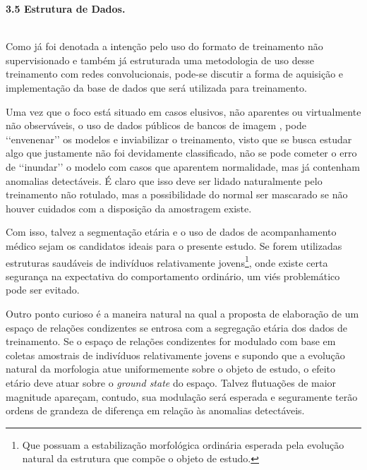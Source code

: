 \documentclass[a4paper, 12pt]{report}
\begin{document}
$\frac{}{}$\\
\begin{Large}
	\textbf{3.5 Estrutura de Dados.}
\end{Large}
$\frac{}{}$\\

Como já foi denotada a intenção pelo uso do formato de treinamento não supervisionado\cite{Garg2016,Zhang2022,Nakao2021,Cao2022} e também já estruturada uma metodologia de uso desse treinamento com redes convolucionais, pode-se discutir a forma de aquisição e implementação da base de dados que será utilizada para treinamento. 

Uma vez que o foco está situado em casos elusivos, não aparentes ou virtualmente não observáveis, o uso de dados públicos de bancos de imagem \cite{LaMontagne2019,Marcus2010,Marcus2007,2020, 2025}, pode {\lq\lq}envenenar{\rq\rq} os modelos e inviabilizar o treinamento, visto que se busca estudar algo que justamente não foi devidamente classificado, não se pode cometer o erro de {\lq\lq}inundar{\rq\rq} o modelo com casos que aparentem normalidade, mas já contenham anomalias detectáveis. É claro que isso deve ser lidado naturalmente pelo treinamento não rotulado, mas a possibilidade do normal ser mascarado se não houver cuidados com a disposição da amostragem existe.

Com isso, talvez a segmentação etária e o uso de dados de acompanhamento médico
sejam os candidatos ideais para o presente estudo. Se forem utilizadas estruturas saudáveis de indivíduos relativamente jovens\footnote{Que possuam a estabilização morfológica ordinária esperada pela evolução natural da estrutura que compõe o objeto de estudo.}, onde existe certa segurança na expectativa do comportamento ordinário, um viés problemático pode ser evitado.

Outro ponto curioso é a maneira natural na qual a proposta de elaboração de um espaço de relações condizentes se entrosa com a segregação etária dos dados de treinamento. Se o espaço de relações condizentes for modulado com base em coletas amostrais de indivíduos relativamente jovens e supondo que a evolução natural da morfologia atue uniformemente sobre o objeto de estudo, o efeito etário deve atuar sobre o \textit{ground state} do espaço. Talvez flutuações de maior magnitude apareçam, contudo, sua modulação será esperada e seguramente terão ordens de grandeza de diferença em relação às anomalias detectáveis.
\end{document}
